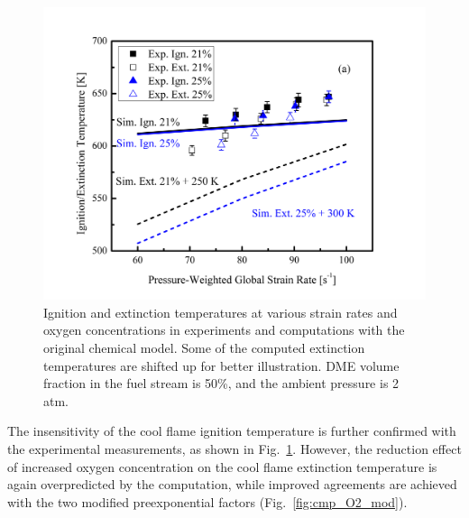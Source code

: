 \begin{figure}[t]
  \centering
  \scriptsize
  \includegraphics[width=1.0\textwidth]{ch-NTC/cmp_O2.png}
  \normalsize
  \caption{Ignition and extinction temperatures at various strain rates and oxygen concentrations in experiments and computations with the original chemical model.  Some of the computed extinction temperatures are shifted up for better illustration.  DME volume fraction in the fuel stream is 50\%, and the ambient pressure is 2 atm.}
  \label{fig:cmp_O2_ori}
\end{figure}  

The insensitivity of the cool flame ignition temperature is further confirmed with the experimental measurements, as shown in Fig.~\ref{fig:cmp_O2_ori}.  However, the reduction effect of increased oxygen concentration on the cool flame extinction temperature is again overpredicted by the computation, while improved agreements are achieved with the two modified preexponential factors (Fig.~\ref{fig:cmp_O2_mod}).

